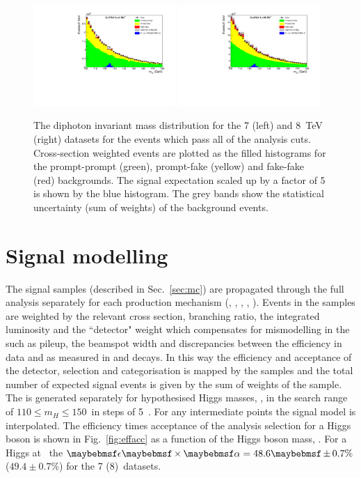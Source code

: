 \begin{figure}
  \includegraphics[width=0.48\textwidth]{analysis/plots/mgg_bkg_7TeV.pdf}
  \includegraphics[width=0.48\textwidth]{analysis/plots/mgg_bkg_8TeV.pdf}
  \caption[Diphoton invariant mass distributions for the datasets at 7 and 8~TeV]{The diphoton invariant mass distribution for the 7 (left) and 8~TeV (right) datasets for the events which pass all of the analysis cuts. Cross-section weighted \MC events are plotted as the filled histograms for the prompt-prompt (green), prompt-fake (yellow) and fake-fake (red) backgrounds. The \SM signal expectation scaled up by a factor of 5 is shown by the blue histogram. The grey bands show the statistical uncertainty (sum of weights) of the background \MC events.}
  \label{fig:inv_mass_plots}
\end{figure}

\section{Signal modelling}
\label{sec:signal_model}

The signal \MC samples (described in Sec.~\ref{sec:mc}) are propagated through the full analysis separately for each production mechanism (\ggH, \VBF, \WH, \ZH, \ttH). Events in the samples are weighted by the relevant \SM cross section, branching ratio, the integrated luminosity and the ``detector" weight which compensates for mismodelling in the \MC such as pileup, the beamspot width and discrepancies between the efficiency in data and \MC as measured in \Zee and \Zmumugamma decays. In this way the efficiency and acceptance of the detector, selection and categorisation is mapped by the \MC samples and the total number of expected \SM signal events is given by the sum of weights of the sample. The \MC is generated separately for hypothesised Higgs masses, \mH, in the search range of $110 \leq m_{H} \leq 150$~\GeV in steps of 5~\GeV. For any intermediate points the signal model is interpolated. The efficiency times acceptance of the analysis selection for a \SM Higgs boson is shown in Fig.~\ref{fig:effacc} as a function of the Higgs boson mass, \mH. For a Higgs at ~\GeV the $\ea=48.6\pm 0.7\%$ ($49.4\pm 0.7\%$) for the 7 (8)~\TeV datasets.

